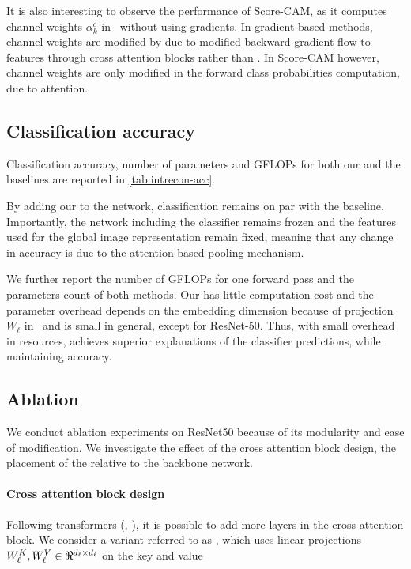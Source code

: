 It is also interesting to observe the performance of Score-CAM, as it computes channel weights 
$\alpha_k^c$ in~ without using gradients. 
In gradient-based methods, channel weights are modified by \Ours due to modified backward gradient 
flow to features through cross attention blocks rather than \gap.
In Score-CAM however, channel weights are only modified in the forward class probabilities 
computation, due to attention.

\subsection{Classification accuracy}
\label{subsec:classification}
Classification accuracy, number of parameters and GFLOPs for both our \Ours and the baselines are 
reported in \autoref{tab:intrecon-acc}.



By adding our \Ours to the network, classification remains on par with the baseline. Importantly, 
the network including the classifier remains frozen and the features used for the global image 
representation remain fixed, meaning that any change in accuracy is due to the attention-based 
pooling mechanism. 


We further report the number of GFLOPs for one forward pass and the parameters count of both 
methods.
Our \Ours has little computation cost and the parameter overhead depends on the embedding dimension 
because of projection $W_\ell$ in~ and is small in general, except for ResNet-50. 
Thus, with small overhead in resources, \Ours achieves superior explanations of the classifier 
predictions, while maintaining accuracy.

\subsection{Ablation}
\label{sec:gen_ablation}

We conduct ablation experiments on ResNet50 because of its modularity and ease of modification. We 
investigate the effect of the cross attention block design, the placement of the \Ours relative to 
the backbone network.

\paragraph{Cross attention block design}
Following transformers (\cite{vaswani2017attention}, \cite{dosovitskiy2020image}), it is possible to 
add more layers in the cross attention block. We consider a variant referred to as \PO, which uses 
linear projections $W_\ell^K, W_\ell^V \in \real^{d_\ell \times d_\ell}$ on the key and value

